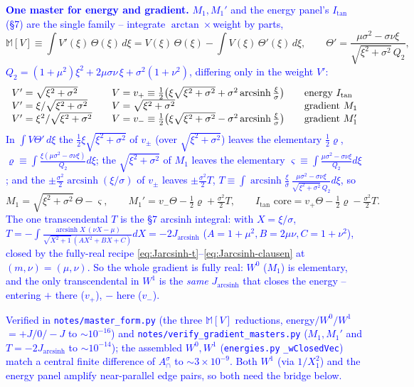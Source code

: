 \documentclass[11pt]{article}
\numberwithin{equation}{section}
\DeclareMathOperator{\arcsinh}{arcsinh}
\newcommand{\cam}[1]{\textcolor{blue}{#1}}
\begin{document}
\cam{\textbf{One master for energy and gradient.} $M_1,M_1'$ and the energy panel's $I_{\tan}$ (\S7) are
the single family -- integrate $\arctan\times$weight by parts,}
\[
  \mathbb M[V]\equiv\int V'(\xi)\,\Theta(\xi)\,d\xi=V(\xi)\,\Theta(\xi)-\int V(\xi)\,\Theta'(\xi)\,d\xi,
  \qquad \Theta'=\frac{\mu\sigma^2-\sigma\nu\xi}{\sqrt{\xi^2+\sigma^2}\,Q_2},
\]
\cam{$Q_2=(1+\mu^2)\xi^2+2\mu\sigma\nu\,\xi+\sigma^2(1+\nu^2)$, differing only in the weight $V'$:}
\[
\begin{array}{l@{\qquad}l@{\qquad}l}
  V'=\sqrt{\xi^2+\sigma^2} & V=v_+\equiv\tfrac12\big(\xi\sqrt{\xi^2+\sigma^2}+\sigma^2\arcsinh\tfrac\xi\sigma\big) & \text{energy }I_{\tan}\\
  V'=\xi/\sqrt{\xi^2+\sigma^2} & V=\sqrt{\xi^2+\sigma^2} & \text{gradient }M_1\\
  V'=\xi^2/\sqrt{\xi^2+\sigma^2} & V=v_-\equiv\tfrac12\big(\xi\sqrt{\xi^2+\sigma^2}-\sigma^2\arcsinh\tfrac\xi\sigma\big) & \text{gradient }M_1'
\end{array}
\]
\cam{In $\int V\Theta'\,d\xi$ the $\tfrac12\xi\sqrt{\xi^2+\sigma^2}$ of $v_\pm$ (over $\sqrt{\xi^2+\sigma^2}$)
leaves the elementary $\tfrac12\varrho$, $\varrho\equiv\int\tfrac{\xi(\mu\sigma^2-\sigma\nu\xi)}{Q_2}d\xi$;
the $\sqrt{\xi^2+\sigma^2}$ of $M_1$ leaves the elementary $\varsigma\equiv\int\tfrac{\mu\sigma^2-\sigma\nu\xi}
{Q_2}d\xi$; and the $\pm\tfrac{\sigma^2}2\arcsinh(\xi/\sigma)$ of $v_\pm$ leaves $\pm\tfrac{\sigma^2}2T$,
$T\equiv\int\arcsinh\tfrac\xi\sigma\,\tfrac{\mu\sigma^2-\sigma\nu\xi}{\sqrt{\xi^2+\sigma^2}\,Q_2}d\xi$, so}
\[
  M_1=\sqrt{\xi^2+\sigma^2}\,\Theta-\varsigma,\qquad
  M_1'=v_-\Theta-\tfrac12\varrho+\tfrac{\sigma^2}2T,\qquad
  I_{\tan}\text{ core}=v_+\Theta-\tfrac12\varrho-\tfrac{\sigma^2}2T .
\]
\cam{The one transcendental $T$ is the \S7 arcsinh integral: with $X=\xi/\sigma$,
$T=-\!\int\!\tfrac{\arcsinh X\,(\nu X-\mu)}{\sqrt{X^2+1}\,(AX^2+BX+C)}dX=-2J_{\arcsinh}$
($A=1+\mu^2,B=2\mu\nu,C=1+\nu^2$), closed by the fully-real recipe
\eqref{eq:Jarcsinh-t}--\eqref{eq:Jarcsinh-clausen} at $(m,\nu)=(\mu,\nu)$. So the whole gradient is fully
real: $W^0$ ($M_1$) is elementary, and the only transcendental in $W^1$ is the \emph{same} $J_{\arcsinh}$
that closes the energy -- entering $+$ there ($v_+$), $-$ here ($v_-$).}

\cam{Verified in \texttt{notes/master\_form.py} (the three $\mathbb M[V]$ reductions, energy$/W^0/W^1$
$=+J/0/-J$ to $\sim10^{-16}$) and \texttt{notes/verify\_gradient\_masters.py} ($M_1,M_1'$ and
$T=-2J_{\arcsinh}$ to $\sim10^{-14}$); the assembled $W^0,W^1$ (\texttt{energies.py} \texttt{\_wClosedVec})
match a central finite difference of $A_\cap^\sigma$ to $\sim3\times10^{-9}$. Both $W^1$ (via $1/X_1^2$)
and the energy panel amplify near-parallel edge pairs, so both need the bridge below.}
\end{document}
